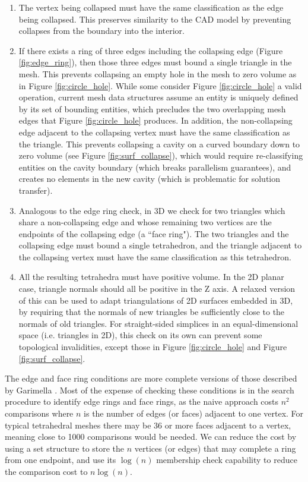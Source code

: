 \begin{enumerate}
\item The vertex being collapsed must have the same classification as
the edge being collapsed. This preserves similarity to the CAD model by
preventing collapses from the boundary into the interior.
\item If there exists a ring of three edges including the collapsing edge
(Figure \ref{fig:edge_ring}),
then those three edges must bound a single triangle in the mesh.
This prevents collapsing an empty hole in the mesh to zero volume as in
Figure \ref{fig:circle_hole}.
While some \cite{beall1997general} consider Figure \ref{fig:circle_hole}
a valid operation, current mesh data structures assume an entity is uniquely
defined by its set of bounding entities, which precludes the two overlapping
mesh edges that Figure \ref{fig:circle_hole} produces.
In addition, the non-collapsing edge adjacent to the collapsing vertex must have the same
classification as the triangle.
This prevents collapsing a cavity on a curved boundary down to zero volume
(see Figure \ref{fig:surf_collapse}), which would require re-classifying
entities on the cavity boundary (which breaks parallelism guarantees), and
creates no elements in the new cavity (which is problematic for solution transfer).
\item Analogous to the edge ring check, in 3D we check for two triangles which
share a non-collapsing edge and whose remaining two vertices are the endpoints
of the collapsing edge (a ``face ring").
The two triangles and the collapsing edge must bound a single tetrahedron,
and the triangle adjacent to the collapsing vertex must have the same classification
as this tetrahedron.
\item All the resulting tetrahedra must have positive volume.
In the 2D planar case, triangle normals should all be positive in the Z axis.
A relaxed version of this can be used to adapt triangulations of 2D surfaces
embedded in 3D, by requiring that the normals of new triangles be sufficiently
close to the normals of old triangles.
For straight-sided simplices in an equal-dimensional space (i.e. triangles in 2D),
this check on its own can prevent some topological invalidities, except
those in Figure \ref{fig:circle_hole} and Figure \ref{fig:surf_collapse}.
\end{enumerate}

The edge and face ring conditions are more complete versions of those described
by Garimella \cite{garimella1999anisotropic}.
Most of the expense of checking these conditions is in the search procedure
to identify edge rings and face rings, as the naive approach costs $n^2$
comparisons where $n$ is the number of edges (or faces) adjacent to one vertex.
For typical tetrahedral meshes there may be 36 or more faces adjacent to a vertex,
meaning close to 1000 comparisons would be needed.
We can reduce the cost by using a set structure to store the $n$ vertices (or edges)
that may complete a ring from one endpoint, and use its $\log(n)$ membership check
capability to reduce the comparison cost to $n\log(n)$.

